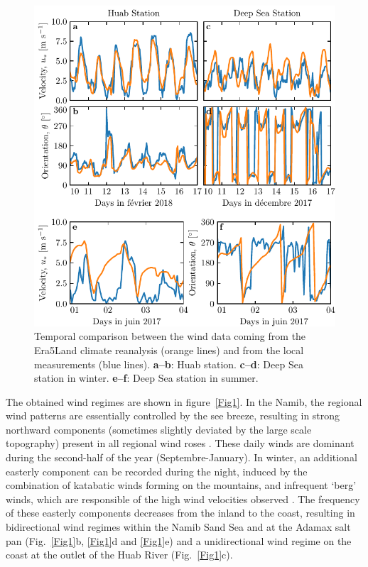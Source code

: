   \begin{figure}
    \centering
    \includegraphics[scale=1]{Figures/Figure2.pdf}
    \caption{Temporal comparison between the wind data coming from the Era5Land climate reanalysis (orange lines) and from the local measurements (blue lines). \textbf{a--b}: Huab station. \textbf{c--d}: Deep Sea station in winter. \textbf{e--f}: Deep Sea station in summer.}
    \label{Fig2}
  \end{figure}

  The obtained wind regimes are shown in figure~\ref{Fig1}. In the Namib, the regional wind patterns are essentially controlled by the see breeze, resulting in strong northward components (sometimes slightly deviated by the large scale topography) present in all regional wind roses \citep{lancaster1985}. These daily winds are dominant during the second-half of the year (Septembre-January). In winter, an additional easterly component can be recorded during the night, induced by the combination of katabatic winds forming on the mountains, and infrequent `berg' winds, which are responsible of the high wind velocities observed \citep{lancaster1984}. The frequency of these easterly components decreases from the inland to the coast, resulting in bidirectional wind regimes within the Namib Sand Sea and at the Adamax salt pan (Fig.~\ref{Fig1}b, \ref{Fig1}d and \ref{Fig1}e) and a unidirectional wind regime on the coast at the outlet of the Huab River (Fig.~\ref{Fig1}c).

